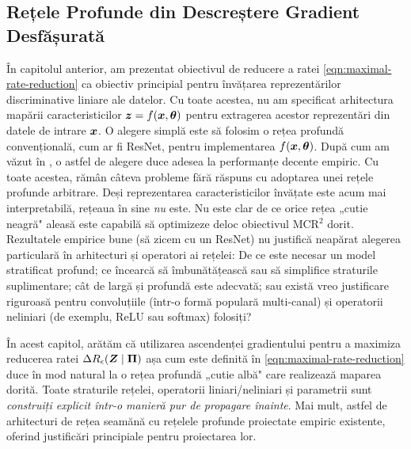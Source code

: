 \documentclass[../../book-main_ro.tex]{subfiles}
\begin{document}
\subsection{Rețele Profunde din Descreștere Gradient Desfășurată}

În capitolul anterior, am prezentat obiectivul de reducere a ratei \eqref{eqn:maximal-rate-reduction} ca obiectiv principial pentru învățarea reprezentărilor discriminative liniare ale datelor. Cu toate acestea, nu am specificat arhitectura mapării caracteristicilor $\bm{z} = f(\bm{x}, \bm \theta)$ pentru extragerea acestor reprezentări din datele de intrare $\bm{x}$. 
O alegere simplă este să folosim o rețea profundă convențională, cum ar fi ResNet, pentru implementarea $f(\bm{x}, \bm \theta)$. După cum am văzut în , o astfel de alegere duce adesea la performanțe decente empiric. Cu toate acestea, rămân câteva probleme fără răspuns cu adoptarea unei rețele profunde arbitrare. Deși reprezentarea caracteristicilor învățate este acum mai interpretabilă, rețeaua în sine {\em nu} este. Nu este clar de ce orice rețea „cutie neagră" aleasă este capabilă să optimizeze deloc obiectivul MCR$^2$ dorit. Rezultatele empirice bune (să zicem cu un ResNet) nu justifică neapărat alegerea particulară în arhitecturi și operatori ai rețelei: De ce este necesar un model stratificat profund; ce încearcă să îmbunătățească sau să simplifice straturile suplimentare; cât de largă și profundă este adecvată; sau există vreo justificare riguroasă pentru convoluțiile (într-o formă populară multi-canal) și operatorii neliniari (de exemplu, ReLU sau softmax) folosiți? 

În acest capitol, arătăm că utilizarea ascendenței gradientului pentru a maximiza reducerea ratei $\Delta R_{\epsilon}(\bm{Z} \mid \bm \Pi)$ așa cum este definită în \eqref{eqn:maximal-rate-reduction} duce în mod natural la o rețea profundă „cutie albă" care realizează maparea dorită. Toate straturile rețelei, operatorii liniari/neliniari și parametrii sunt {\em construiți explicit într-o manieră pur de propagare înainte}. Mai mult, astfel de arhitecturi de rețea seamănă cu rețelele profunde proiectate empiric existente, oferind justificări principiale pentru proiectarea lor.
\end{document}
